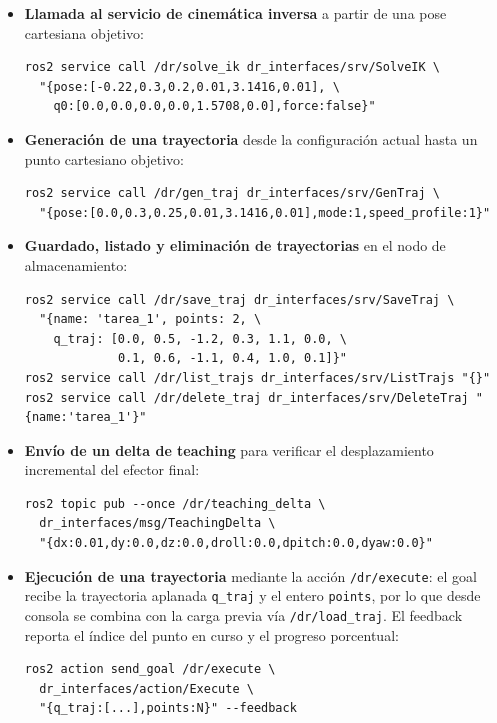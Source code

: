 \documentclass{article}
\begin{document}
\begin{appendices}
\begin{itemize}
    \item \textbf{Llamada al servicio de cinemática inversa} a partir de una pose cartesiana objetivo:
\begin{lstlisting}[basicstyle=\footnotesize\ttfamily, breaklines=true]
ros2 service call /dr/solve_ik dr_interfaces/srv/SolveIK \
  "{pose:[-0.22,0.3,0.2,0.01,3.1416,0.01], \
    q0:[0.0,0.0,0.0,0.0,1.5708,0.0],force:false}"
\end{lstlisting}

    \item \textbf{Generación de una trayectoria} desde la configuración actual hasta un punto cartesiano objetivo:
\begin{lstlisting}[basicstyle=\footnotesize\ttfamily, breaklines=true]
ros2 service call /dr/gen_traj dr_interfaces/srv/GenTraj \
  "{pose:[0.0,0.3,0.25,0.01,3.1416,0.01],mode:1,speed_profile:1}"
\end{lstlisting}

    \item \textbf{Guardado, listado y eliminación de trayectorias} en el nodo de almacenamiento:
\begin{lstlisting}[basicstyle=\footnotesize\ttfamily, breaklines=true]
ros2 service call /dr/save_traj dr_interfaces/srv/SaveTraj \
  "{name: 'tarea_1', points: 2, \
    q_traj: [0.0, 0.5, -1.2, 0.3, 1.1, 0.0, \
             0.1, 0.6, -1.1, 0.4, 1.0, 0.1]}"
ros2 service call /dr/list_trajs dr_interfaces/srv/ListTrajs "{}"
ros2 service call /dr/delete_traj dr_interfaces/srv/DeleteTraj "{name:'tarea_1'}"
\end{lstlisting}

    \item \textbf{Envío de un delta de teaching} para verificar el desplazamiento incremental del efector final:
\begin{lstlisting}[basicstyle=\footnotesize\ttfamily, breaklines=true]
ros2 topic pub --once /dr/teaching_delta \
  dr_interfaces/msg/TeachingDelta \
  "{dx:0.01,dy:0.0,dz:0.0,droll:0.0,dpitch:0.0,dyaw:0.0}"
\end{lstlisting}

    \item \textbf{Ejecución de una trayectoria} mediante la acción \texttt{/dr/execute}: el goal recibe la trayectoria aplanada \texttt{q\_traj} y el entero \texttt{points}, por lo que desde consola se combina con la carga previa vía \texttt{/dr/load\_traj}. El feedback reporta el índice del punto en curso y el progreso porcentual:
\begin{lstlisting}[basicstyle=\footnotesize\ttfamily, breaklines=true]
ros2 action send_goal /dr/execute \
  dr_interfaces/action/Execute \
  "{q_traj:[...],points:N}" --feedback
\end{lstlisting}


\end{itemize}
\end{appendices}
\end{document}
